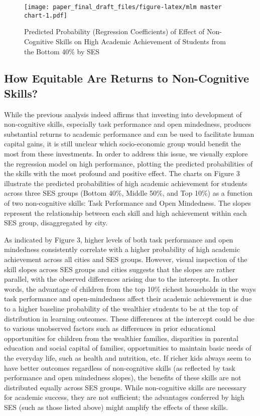 \documentclass[
  12pt,
  a4paper,
]{article}
\begin{document}
\begin{figure}
\centering
\texttt{[image: paper\_final\_draft\_files/figure-latex/mlm master chart-1.pdf]}
\caption{Predicted Probability (Regression Coefficients) of Effect of
Non-Cognitive Skills on High Academic Achievement of Students from the
Bottom 40\% by SES}
\end{figure}

\hypertarget{how-equitable-are-returns-to-non-cognitive-skills}{%
\subsection{How Equitable Are Returns to Non-Cognitive
Skills?}\label{how-equitable-are-returns-to-non-cognitive-skills}}

While the previous analysis indeed affirms that investing into
development of non-cognitive skills, especially task performance and
open mindedness, produces substantial returns to academic performance
and can be used to facilitate human capital gains, it is still unclear
which socio-economic group would benefit the most from these
investments. In order to address this issue, we visually explore the
regression model on high performance, plotting the predicted
probabilities of the skills with the most profound and positive effect.
The charts on Figure 3 illustrate the predicted probabilities of high
academic achievement for students across three SES groups (Bottom 40\%,
Middle 50\%, and Top 10\%) as a function of two non-cognitive skills:
Task Performance and Open Mindedness. The slopes represent the
relationship between each skill and high achievement within each SES
group, disaggregated by city.

As indicated by Figure 3, higher levels of both task performance and
open mindedness consistently correlate with a higher probability of high
academic achievement across all cities and SES groups. However, visual
inspection of the skill slopes across SES groups and cities suggests
that the slopes are rather parallel, with the observed differences
arising due to the intercepts. In other words, the advantage of children
from the top 10\% richest households in the ways task performance and
open-mindedness affect their academic achievement is due to a higher
baseline probability of the wealthier students to be at the top of
distribution in learning outcomes. These differences at the intercept
could be due to various unobserved factors such as differences in prior
educational opportunities for children from the wealthier families,
disparities in parental education and social capital of families,
opportunities to maintain basic needs of the everyday life, such as
health and nutrition, etc. If richer kids always seem to have better
outcomes regardless of non-cognitive skills (as reflected by task
performance and open mindedness slopes), the benefits of these skills
are not distributed equally across SES groups. While non-cognitive
skills are necessary for academic success, they are not sufficient; the
advantages conferred by high SES (such as those listed above) might
amplify the effects of these skills.
\end{document}
